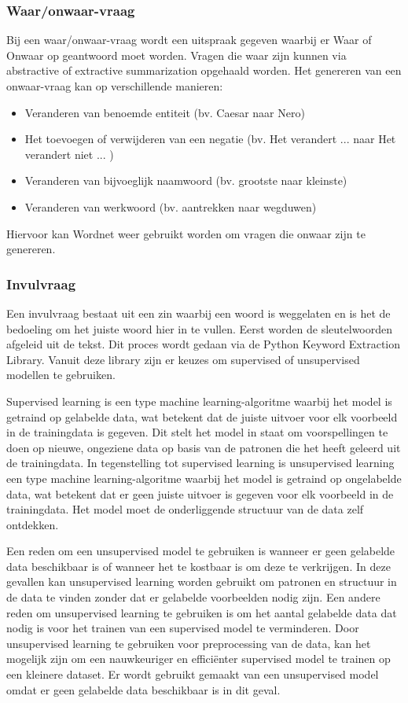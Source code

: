\subsubsection{Waar/onwaar-vraag}
\label{sec:waar/onwaar-vraag}
Bij een waar/onwaar-vraag wordt een uitspraak gegeven waarbij er Waar of Onwaar op geantwoord moet worden.
Vragen die waar zijn kunnen via abstractive of extractive summarization opgehaald worden. 
Het genereren van een onwaar-vraag kan op verschillende manieren:
\begin{itemize}
    \item Veranderen van benoemde entiteit (bv. Caesar naar Nero)
    \item Het toevoegen of verwijderen van een negatie  (bv. Het verandert ... naar Het verandert niet ... )
    \item Veranderen van bijvoeglijk naamwoord (bv. grootste naar kleinste)
    \item Veranderen van werkwoord (bv. aantrekken naar wegduwen)
\end{itemize}

Hiervoor kan Wordnet weer gebruikt worden om vragen die onwaar zijn te genereren.

\subsubsection{Invulvraag}
\label{sec:invulvraag}
Een invulvraag bestaat uit een zin waarbij een woord is weggelaten en is het de bedoeling om het juiste woord hier in te vullen.
Eerst worden de sleutelwoorden afgeleid uit de tekst. Dit proces wordt gedaan via de Python Keyword Extraction Library. Vanuit deze library zijn er keuzes om supervised of unsupervised modellen te gebruiken.\autocite{AIEngineering2021}

Supervised learning is een type machine learning-algoritme waarbij het model is getraind op gelabelde data, wat betekent dat de juiste uitvoer voor elk voorbeeld in de trainingdata is gegeven. Dit stelt het model in staat om voorspellingen te doen op nieuwe, ongeziene data op basis van de patronen die het heeft geleerd uit de trainingdata. In tegenstelling tot supervised learning is unsupervised learning een type machine learning-algoritme waarbij het model is getraind op ongelabelde data, wat betekent dat er geen juiste uitvoer is gegeven voor elk voorbeeld in de trainingdata. Het model moet de onderliggende structuur van de data zelf ontdekken.

Een reden om een unsupervised model te gebruiken is wanneer er geen gelabelde data beschikbaar is of wanneer het te kostbaar is om deze te verkrijgen. In deze gevallen kan unsupervised learning worden gebruikt om patronen en structuur in de data te vinden zonder dat er gelabelde voorbeelden nodig zijn. Een andere reden om unsupervised learning te gebruiken is om het aantal gelabelde data dat nodig is voor het trainen van een supervised model te verminderen. Door unsupervised learning te gebruiken voor preprocessing van de data, kan het mogelijk zijn om een nauwkeuriger en efficiënter supervised model te trainen op een kleinere dataset. Er wordt gebruikt gemaakt van een unsupervised model omdat er geen gelabelde data beschikbaar is in dit geval.

